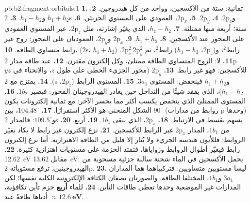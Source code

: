 \begin{solution}{pb:b2:fragment-orbitals:1}
\textbf{1.} ثمانية: ستة من الأكسجين، وواحد من كل هيدروجين.
\textbf{2.} $h_1 + h_2$ و$h_1 - h_2$.
\textbf{3.} 2s و$2\mathrm p_z$.
\textbf{4.} $2\mathrm p_y$.
\textbf{5.} $2\mathrm p_x$، العمودي على المستوي الجزيئي.
\textbf{6.} ستة؛ أربعة منها ممتلئة.
\textbf{7.} $h_1 - h_2$، الذي يغيّر إشارته، مثل $2\mathrm p_z$، عبر المستوي
العمودي على المحور عند الأكسجين.
\textbf{8.} $h_1 + h_2$.
\textbf{9.} $2\mathrm p_x$ و$2\mathrm p_y$، العموديان على المحور: زوج غير رابط
متساوي الطاقة.
\textbf{10.} (2s، $h_1 + h_2$) رابط$^2$، و($2\mathrm p_z$، $h_1 - h_2$) رابط$^2$، ثم
$2\mathrm p_x^2\,2\mathrm p_y^2$.
\textbf{11.} لا: الزوج المتساوي الطاقة ممتلئ، وكل إلكترون مقترن.
\textbf{12.} عند طاقة مدار 2p للأكسجين: فهو غير رابط.
\textbf{13.} $2\mathrm p_y$ (محور الجزيء الخطي على طول $z$، والانحناء في $yz$).
\textbf{14.} يمتزج مع 2s و$h_1 + h_2$ فينخفض: المستوى $3a_1$.
\textbf{15.} المستوى الرابط ($2\mathrm p_z$، $h_1 - h_2$)، الذي يفقد شيئًا من التداخل حين
يغادر الهيدروجينان المحور: فيصير $1b_2$.
\textbf{16.} المستوى الممتلئ الذي ينخفض يكسب أكثر مما يخسر الآخر: مع ثمانية
إلكترونات يكون الشكل المنحني هو الأكثر استقرارًا.
\textbf{17.} $104.48^\circ$، بين $90^\circ$ (روابط من مدارات p وحدها) و$109.5^\circ$:
فالمدار 2s يسهم بقسط في الارتباط.
\textbf{18.} $2\mathrm p_x$، الذي يبقى  $1b_1$.
\textbf{19.} أربع.
\textbf{20.} من $1b_1$، المدار $2\mathrm p_x$ غير الرابط للأكسجين.
\textbf{21.} نزع إلكترون غير رابط لا يكاد يغيّر الروابط: فللأيون
هندسة الجزيء ولا يُثار إلا قليل من الطاقة الاهتزازية. أما نزع إلكترون
رابط فيغيّر أطوال الروابط وزواياها، فتمتد الحزمة على
مستويات اهتزازية كثيرة.
\textbf{22.} \qty{12.62}{eV} مقابل \qty{13.62}{eV}: يحمل الأكسجين في الماء شحنة
سالبة جزئية مسحوبة من الهيدروجينين، ترفع مستوياته 2p.
\textbf{23.} ليسا مستويين متساويين: فتركيباهما هما المداران $3a_1$ 
و$1b_1$، المختلفا الطاقة. والصورتان تصفان الكثافة الإلكترونية الكلية نفسها؛
لكن المدارات غير الموضعية وحدها تعطي طاقات التأين.
\textbf{24.} للماء \textbf{أربع} حزم تأين تكافؤية، أدناها طاقةً عند
$\boldsymbol{\approx \qty{12.6}{eV}}$.
\end{solution}
